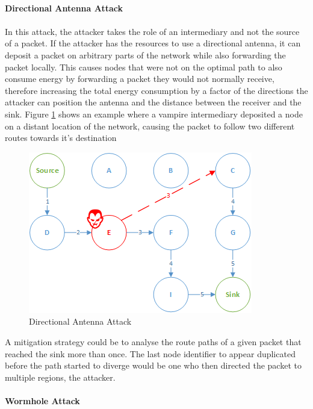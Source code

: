 \paragraph{\textbf{Directional Antenna Attack}}
\paragraph{}
In this attack, the attacker takes the role of an intermediary and not the source of a packet. If the attacker has the resources to use a directional antenna, it can deposit a packet on arbitrary parts of the network while also forwarding the packet locally. This causes nodes that were not on the optimal path to also consume energy by forwarding a packet they would not normally receive, therefore increasing the total energy consumption by a factor of the directions the attacker can position the antenna and the distance between the receiver and the sink. Figure \ref{fig:directional_antenna_attack} shows an example where a vampire intermediary deposited a node on a distant location of the network, causing the packet to follow two different routes towards it's destination

\begin{figure}[h]
  \centering
  \includegraphics[width=0.8\linewidth]{figures/Directional_Antenna_Attack.png}
  \caption{Directional Antenna Attack}
  \label{fig:directional_antenna_attack}
\end{figure}

A mitigation strategy could be to analyse the route paths of a given packet that reached the sink more than once. The last node identifier to appear duplicated before the path started to diverge would be one who then directed the packet to multiple regions, the attacker.

\paragraph{\textbf{Wormhole Attack}}
